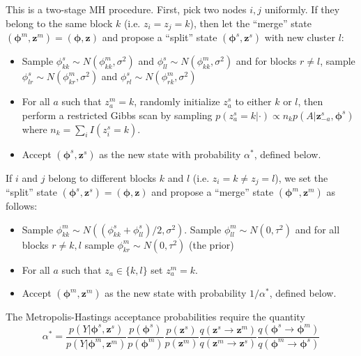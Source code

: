 \documentclass{article}
\begin{document}
This is a two-stage MH procedure.  First, pick two nodes $i,j$ uniformly.  If they belong to the same block $k$ (i.e. $z_i=z_j=k$), then let the ``merge'' state $(\boldsymbol{\phi}^{m},\mathbf{z}^{m}) = (\boldsymbol{\phi},\mathbf{z})$ and propose a ``split'' state $(\boldsymbol{\phi}^{s},\mathbf{z}^{s})$ with new cluster $l$:
\begin{itemize}
\item Sample $\phi_{kk}^{s} \sim N(\phi_{kk}^{m},\sigma^2)$ and $\phi_{ll}^{s} \sim N(\phi_{kk}^{m},\sigma^2)$ and for blocks $r \ne l$, sample $\phi_{lr}^{s} \sim N(\phi_{kr}^{m},\sigma^2)$ and $\phi_{rl}^{s} \sim N(\phi_{rk}^{m},\sigma^2)$ 
\item For all $a$ such that $z_a^{m} = k$, randomly initialize $z_a^{s}$ to either $k$ or $l$, then perform a restricted Gibbs scan by sampling $p(z_{a}^{s}=k|\cdot)  \propto n_k p(A|\mathbf{z}^{s}_{-a},\boldsymbol{\phi}^{s})$
where $n_k=\sum_{i}I(z_i^{s}=k)$.%
\item Accept  $(\boldsymbol{\phi}^{s},\mathbf{z}^{s})$ as the new state with probability $\alpha^*$, defined below.
\end{itemize}

 If $i$ and $j$ belong to different blocks $k$ and $l$ (i.e. $z_i = k \ne z_j=l$), we set the ``split'' state  $(\boldsymbol{\phi}^{s},\mathbf{z}^{s}) = (\boldsymbol{\phi},\mathbf{z})$ and propose a ``merge'' state $(\boldsymbol{\phi}^{m},\mathbf{z}^{m})$ as follows:
\begin{itemize}
\item Sample $\phi_{kk}^m \sim N((\phi_{kk}^s + \phi_{ll}^s)/2,
  \sigma^2)$.  Sample $\phi_{ll}^m \sim N(0,\tau^2)$ and for all blocks $r \ne k,l$ sample $\phi_{kr}^{m} \sim N(0,\tau^2)$ (the prior)
\item For all $a$ such that $z_a \in \{k,l\}$ set $z_a^m = k$.
\item Accept $(\boldsymbol{\phi}^{m},\mathbf{z}^{m})$ as the new state with probability $1/\alpha^*$, defined below.
\end{itemize}

 The Metropolis-Hastings acceptance probabilities require the quantity
$$\alpha^* =\frac{p(Y|\boldsymbol{\phi}^{s},\mathbf{z}^{s})}{p(Y|\boldsymbol{\phi}^{m},\mathbf{z}^{m})}  \frac{p(\boldsymbol{\phi}^{s})}{p(\boldsymbol{\phi}^{m})} \frac{p(\mathbf{z}^{s})}{p(\mathbf{z}^{m})} \frac{q(\mathbf{z}^{s} \rightarrow \mathbf{z}^{m})}{q( \mathbf{z}^{m} \rightarrow \mathbf{z}^{s})} \frac{q(\boldsymbol{\phi}^{s} \rightarrow \boldsymbol{\phi}^{m})}{q(\boldsymbol{\phi}^{m} \rightarrow \boldsymbol{\phi}^{s})}$$
\end{document}
